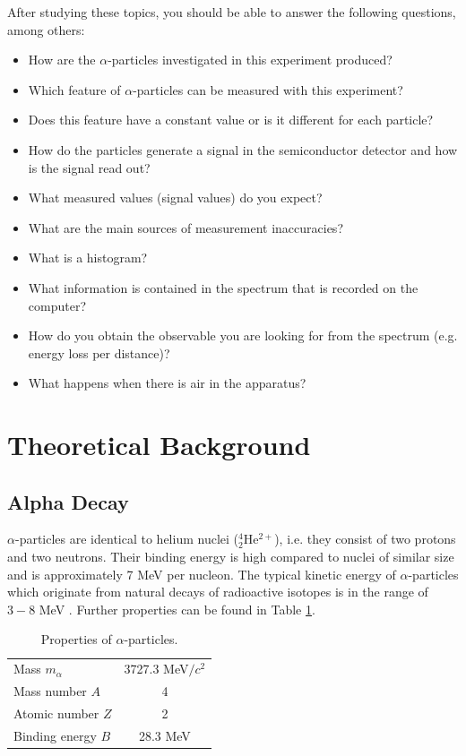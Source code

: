 After studying these topics, you should be able to answer the following questions, among others:
\begin{itemize}[itemsep=0pt]
	\item How are the $\alpha$-particles investigated in this experiment produced?
	\item Which feature of $\alpha$-particles can be measured with this experiment? 
	\item Does this feature have a constant value or is it different for each particle?
	\item How do the particles generate a signal in the semiconductor detector and how is the signal read out?
	\item What measured values (signal values) do you expect?
	\item What are the main sources of measurement inaccuracies?
	\item What is a histogram?
	\item What information is contained in the spectrum that is recorded on the computer?
	\item How do you obtain the observable you are looking for from the spectrum (e.g. energy loss per distance)?
	\item What happens when there is air in the apparatus?
\end{itemize}
%
\section{Theoretical Background}
\label{sec:theory}
%
\subsection{Alpha Decay}
$\alpha$-particles are identical to helium nuclei ($^4_2$He$^{2+}$), i.e. they consist of two protons and two neutrons. Their binding energy is high compared to nuclei of similar size and is approximately 7 MeV per nucleon. The typical kinetic energy of $\alpha$-particles which originate from natural decays of radioactive isotopes is in the range of $3-8$ MeV  \cite{povh-rith}. Further properties can be found in Table \ref{tab:alpha}.
\begin{table}[h]
	\centering
	\begin{tabular}{lc}
		Mass $m_\alpha$    & 3727.3 MeV$/c^{2}$ \\
		Mass number $A$        & 4    \\
		Atomic number $Z$   & 2    \\
		Binding energy $B$   & 28.3 MeV \\
	\end{tabular}
	\caption{Properties of $\alpha$-particles.}\label{tab:alpha}
\end{table}

